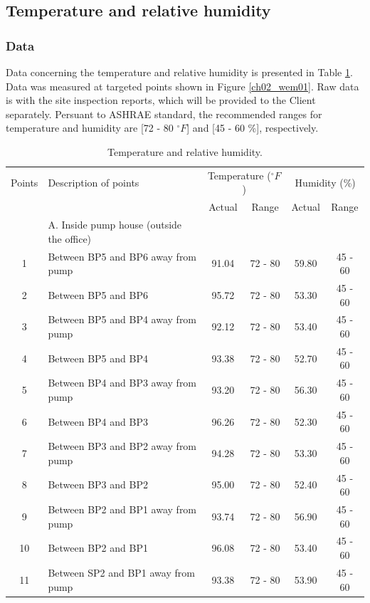 \subsection{Temperature and relative humidity}
\subsubsection{Data}
Data concerning the temperature and relative humidity is presented in Table \ref{ch04_tbl_wem01}. Data was measured at targeted points shown in Figure \ref{ch02_wem01}. Raw data is with the site inspection reports, which will be provided to the Client separately. Persuant to ASHRAE standard, the recommended ranges for temperature and humidity are [72 - 80 $^\circ F$] and [45 - 60 \%], respectively.

\begin{table}[!htb]
	\caption{Temperature and relative humidity.}
	\label{ch04_tbl_wem01}
	{\footnotesize
\begin{tabular}{c|l|c|c|c|c}
	\hline
	Points & Description of points & \multicolumn{2}{c|}{Temperature ($^\circ F$)} & \multicolumn{2}{c}{Humidity (\%)} \\ 
	\cline{3-6}
	&  & Actual & Range & Actual & Range \\ 
	\hline
	& A. Inside pump house (outside the office) &  &  &  &  \\ 
	1 & Between BP5 and BP6 away from pump & 91.04 & 72 - 80 & 59.80 & 45 - 60 \\ 
	2 & Between BP5 and BP6 & 95.72 & 72 - 80 & 53.30 & 45 - 60 \\ 
	3 & Between BP5 and BP4 away from pump & 92.12 & 72 - 80 & 53.40 & 45 - 60 \\ 
	4 & Between BP5 and BP4 & 93.38 & 72 - 80 & 52.70 & 45 - 60 \\ 
	5 & Between BP4 and BP3 away from pump & 93.20 & 72 - 80 & 56.30 & 45 - 60 \\ 
	6 & Between BP4 and BP3 & 96.26 & 72 - 80 & 52.30 & 45 - 60 \\ 
	7 & Between BP3 and BP2 away from pump & 94.28 & 72 - 80 & 53.30 & 45 - 60 \\ 
	8 & Between BP3 and BP2 & 95.00 & 72 - 80 & 52.40 & 45 - 60 \\ 
	9 & Between BP2 and BP1 away from pump & 93.74 & 72 - 80 & 56.90 & 45 - 60 \\ 
	10 & Between BP2 and BP1 & 96.08 & 72 - 80 & 53.40 & 45 - 60 \\ 
	11 & Between SP2 and BP1 away from pump & 93.38 & 72 - 80 & 53.90 & 45 - 60 \\ 

\end{tabular}}
\end{table}
